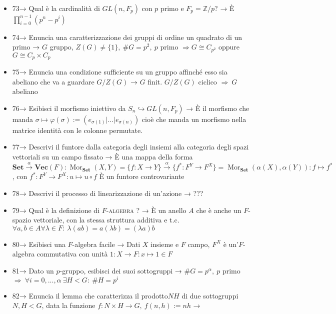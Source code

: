\documentclass[A4,12pt]{article}
\newcommand{\Z}{\mathbb{Z}}
\newcommand{\then}{\Rightarrow}
\newcommand{\psy}{$ p $-sylow }
\begin{document}
\begin{itemize}[noitemsep]
\begin{enumerate}
			\item trovo una classe di gruppi con un \psy banale, cioè $ GL(n,{F}_p) $, $ p $ primo e $ F_p=\Z/p $
			\item esibisco un morfismo iniettivo in $GL(n,{F}_p) $ per un qualsiasi gruppo finito
		\end{enumerate}
		\item 73→ Qual è la cardinalità di $ GL(n,F_p) $ con $ p  $ primo e $ F_p=\Z/p $? → È $ \prod_{i = 0}^{n-1}(p^n-p^i) $
		\item 74→ Enuncia una caratterizzazione dei gruppi di ordine un quadrato di un primo → $ G $ gruppo, $ Z(G)\neq \{1\},\ \# G = p^2,\ p$ primo $ \then G\cong C_{p^2} $ oppure $ G\cong C_p\times C_p $
		\item 75→ Enuncia una condizione sufficiente su un gruppo affinché esso sia abeliano che va a guardare $ G/Z(G) $ → $ G $ finit. $ G/Z(G) $ ciclico $ \then\ G $ abeliano
		\item 76→ Esibisci il morfismo iniettivo da $ S_n\hookrightarrow GL(n,F_p) $ → È il morfismo che manda $ \sigma \mapsto \varphi(\sigma):= (e_{\sigma(1)}|...|e_{\sigma(n)}) $ cioè che manda un morfismo nella matrice identità con le colonne permutate.
		\item 77→ Descrivi il funtore dalla categoria degli insiemi alla categoria degli spazi vettoriali su un campo fissato → È una mappa della forma $ \mathbf{Set}\overset{\alpha}{\to} \mathbf{Vec}(F): \operatorname{Mor}_{\mathbf{Set}}(X,Y) = \{f:X\to Y\}\overset{\alpha}{\to}\{f^*:F^Y\to F^X\} = \operatorname{Mor}_{\mathbf{Set}}(\alpha(X),\alpha(Y)):f\mapsto f^* $, con $ f^*:F^Y\to F^X: u\mapsto u\circ f $ È un funtore controvariante
		\item 78→ Descrivi il processo di linearizzazione di un'azione → ???
		\item 79→ Qual è la definizione di $ F $-\textsc{algebra} ? → È un anello $ A $ che è anche un $ F $-spazio vettoriale, con la stessa struttura additiva e t.c. $ \forall a,b \in A\forall \lambda \in F:\ \lambda(ab) = a(\lambda b) = (\lambda a )b $
		\item 80→ Esibisci una $ F $-algebra facile → Dati $ X $ insieme e $ F $ campo, $ F^X $ è un'$ F $-algebra commutativa con unità $ 1:X\to F:x\mapsto 1\in F $
		\item 81→ Dato un $ p$-gruppo, esibisci dei suoi sottogruppi → $ \# G = p^\alpha,\ p $ primo $ \then\ \forall i = 0,...,\alpha\ \exists H<G:\ \# H = p^i $
		\item 82→ Enuncia il lemma che caratterizza il prodotto$ NH $ di due sottogruppi $ N,H<G $, data la funzione $ f:N\times H\to G,\ f(n,h):= nh $ → \begin{enumerate}[noitemsep]

\end{enumerate}
\end{itemize}
\end{document}
